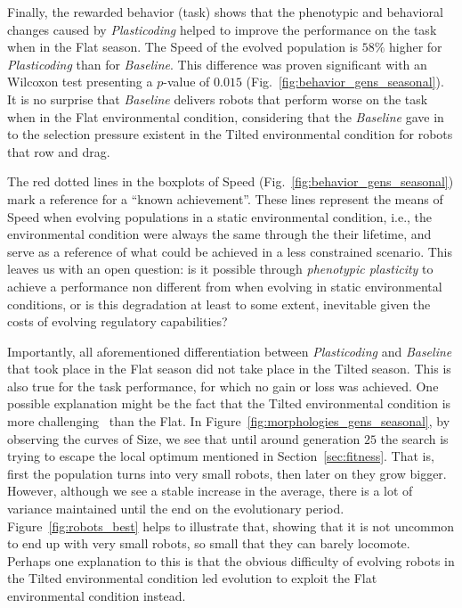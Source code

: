\documentclass[utf8]{frontiersSCNS} %
\begin{document}
Finally, the rewarded behavior (task) shows that the phenotypic and behavioral changes caused by \textit{Plasticoding} helped to improve the performance on the task when in the Flat season. The Speed of the evolved population is $58\%$ higher for \textit{Plasticoding} than for \textit{Baseline}. This difference was proven significant with an Wilcoxon test presenting a $p$-value of $0.015$ (Fig.~\ref{fig:behavior_gens_seasonal}). It is no surprise that \textit{Baseline} delivers robots that perform worse on the task when in the Flat environmental condition, considering that the \textit{Baseline} gave in to the selection pressure existent in the Tilted environmental condition for robots that row and drag.

The red dotted lines in the boxplots of Speed (Fig.~\ref{fig:behavior_gens_seasonal}) mark a reference for a ``known achievement''. These lines represent the means of Speed when evolving populations in a static environmental condition, i.e., the environmental condition were always the same through the their lifetime, and serve as a reference of what could be achieved in a less constrained scenario. This leaves us with an open question: is it possible through \textit{phenotypic plasticity} to achieve a performance non different from when evolving in static environmental conditions, or is this degradation at least to some extent, inevitable given the costs of evolving regulatory capabilities?   

Importantly, all aforementioned differentiation between \textit{Plasticoding} and  \textit{Baseline} that took place in the Flat season did not take place in the Tilted season. This is also true for the task performance, for which no gain or loss was achieved. One possible explanation might be the fact that the Tilted environmental condition is more challenging~\citep{miras2019effects} than the Flat. In Figure~\ref{fig:morphologies_gens_seasonal}, by observing the curves of Size, we see that until around generation $25$ the search is trying to escape the local optimum mentioned in Section~\ref{sec:fitness}. That is, first the population turns into very small robots, then later on they grow bigger. However, although we see a stable increase in the average, there is a lot of variance maintained until the end on the evolutionary period. Figure~\ref{fig:robots_best} helps to illustrate that, showing that it is not uncommon to end up with very small robots, so small that they can barely locomote. Perhaps one explanation to this is that the obvious difficulty of evolving robots in the Tilted environmental condition led evolution to exploit the Flat environmental condition instead.
\end{document}
